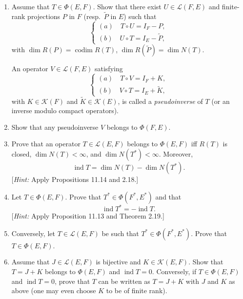\documentclass[12pt]{article}
\begin{document}
\begin{enumerate}
\item Assume that $T \in \Phi(E,F)$. Show that there exist $U \in \mathcal{L}(F,E)$ and finite-rank
projections $P$ in $F$ (resp.\ $\tilde{P}$ in $E$) such that
\begin{equation}\tag{7}
\begin{cases}
(a)\quad T \circ U = I_F - P, \\
(b)\quad U \circ T = I_E - \tilde{P},
\end{cases}
\end{equation}
with $\dim R(P) = \operatorname{codim} R(T)$, $\dim R(\tilde{P}) = \dim N(T)$.
 
 
An operator $V \in \mathcal{L}(F,E)$ satisfying
\begin{equation}\tag{8}
\begin{cases}
(a)\quad T \circ V = I_F + K,\\
(b)\quad V \circ T = I_E + \tilde{K},
\end{cases}
\end{equation}
with $K \in \mathcal{K}(F)$ and $\tilde{K} \in \mathcal{K}(E)$, is called a \emph{pseudoinverse} of $T$
(or an inverse modulo compact operators).
 
\item Show that any pseudoinverse $V$ belongs to $\Phi(F,E)$.
 
\item Prove that an operator $T \in \mathcal{L}(E,F)$ belongs to $\Phi(E,F)$ iff $R(T)$ is closed,
$\dim N(T) < \infty$, and $\dim N(T^*) < \infty$. Moreover,
\[
\operatorname{ind} T = \dim N(T) - \dim N(T^*).
\]
[\textit{Hint:} Apply Propositions 11.14 and 2.18.]
 
\item Let $T \in \Phi(E,F)$. Prove that $T^* \in \Phi(F^*,E^*)$ and that
\[
\operatorname{ind} T^* = -\operatorname{ind} T.
\]
[\textit{Hint:} Apply Proposition 11.13 and Theorem 2.19.]
 
\item Conversely, let $T \in \mathcal{L}(E,F)$ be such that $T^* \in \Phi(F^*,E^*)$. Prove that
$T \in \Phi(E,F)$.
 
\item Assume that $J \in \mathcal{L}(E,F)$ is bijective and $K \in \mathcal{K}(E,F)$. Show that $T = J + K$
belongs to $\Phi(E,F)$ and $\operatorname{ind} T = 0$. Conversely, if $T \in \Phi(E,F)$ and
$\operatorname{ind} T = 0$, prove that $T$ can be written as $T = J + K$ with $J$ and $K$ as above
(one may even choose $K$ to be of finite rank).
 

\end{enumerate}
\end{document}
